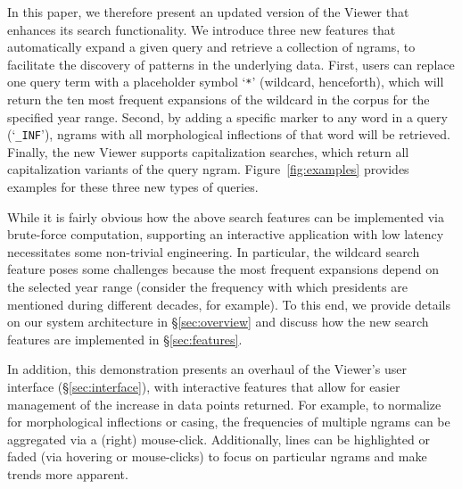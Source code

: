 \documentclass[11pt]{article}
\newcommand{\query}[1]{\texttt{#1}}
\begin{document}
In this paper, we therefore present an updated version of the Viewer that enhances its search functionality. We introduce three new features that automatically expand a given query and retrieve a collection of ngrams, to facilitate the discovery of patterns in the underlying data. First, users can replace one query term with a placeholder symbol `\query{*}' (wildcard, henceforth), which will return the ten most frequent expansions of the wildcard in the corpus for the specified year range. 
Second, by adding a specific marker to any word in a query (`\query{\_INF}'), ngrams with all morphological inflections of that word will be retrieved. 
Finally, the new Viewer supports capitalization searches, which return all capitalization variants of the query ngram. Figure~\ref{fig:examples} provides examples for these three new types of queries.

While it is fairly obvious how the above search features can be implemented via brute-force computation, supporting an interactive application with low latency necessitates some non-trivial engineering. In particular, the wildcard search feature poses some challenges because the most frequent expansions depend on the selected year range (consider the frequency with which presidents are mentioned during different decades, for example). To this end, we provide details on our system architecture in \S\ref{sec:overview}  and discuss how the new search features are implemented in \S\ref{sec:features}.

In addition, this demonstration presents an overhaul of the Viewer's user interface (\S\ref{sec:interface}), with interactive features that allow for easier management of the increase in data points returned. For example, to normalize for morphological inflections or casing, the frequencies of multiple ngrams can be aggregated via a (right) mouse-click. Additionally, lines can be highlighted or faded (via hovering or mouse-clicks) to focus on particular ngrams and make trends more apparent.
\end{document}
